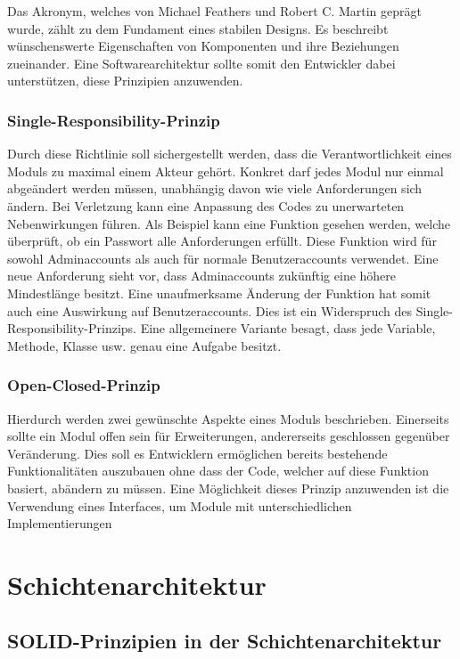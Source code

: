 \documentclass[conference]{IEEEtran}
\begin{document}
Das Akronym, welches von Michael Feathers und Robert C. Martin geprägt wurde, zählt zu dem Fundament eines stabilen Designs. Es beschreibt wünschenswerte Eigenschaften von Komponenten und ihre Beziehungen zueinander. Eine Softwarearchitektur sollte somit den Entwickler dabei unterstützen, diese Prinzipien anzuwenden. 

\subsubsection{Single-Responsibility-Prinzip} Durch diese Richtlinie soll sichergestellt werden, dass die Verantwortlichkeit eines Moduls zu maximal einem Akteur gehört. Konkret darf jedes Modul nur einmal abgeändert werden müssen, unabhängig davon wie viele Anforderungen sich ändern. Bei Verletzung kann eine Anpassung des Codes zu unerwarteten Nebenwirkungen führen. Als Beispiel kann eine Funktion gesehen werden, welche überprüft, ob ein Passwort alle Anforderungen erfüllt. Diese Funktion wird für sowohl Adminaccounts als auch für normale Benutzeraccounts verwendet. Eine neue Anforderung sieht vor, dass Adminaccounts zukünftig eine höhere Mindestlänge besitzt. Eine unaufmerksame Änderung der Funktion hat somit auch eine Auswirkung auf Benutzeraccounts. Dies ist ein Widerspruch des Single-Responsibility-Prinzips. Eine allgemeinere Variante besagt, dass jede Variable, Methode, Klasse usw. genau eine Aufgabe besitzt.

\subsubsection{Open-Closed-Prinzip} Hierdurch werden zwei gewünschte Aspekte eines Moduls beschrieben. Einerseits sollte ein Modul offen sein für Erweiterungen, andererseits geschlossen gegenüber Veränderung. Dies soll es Entwicklern ermöglichen bereits bestehende Funktionalitäten auszubauen ohne dass der Code, welcher auf diese Funktion basiert, abändern zu müssen. Eine Möglichkeit dieses Prinzip anzuwenden ist die Verwendung eines Interfaces, um Module mit unterschiedlichen Implementierungen  

\section{Schichtenarchitektur}



\subsection{SOLID-Prinzipien in der Schichtenarchitektur}
\end{document}
